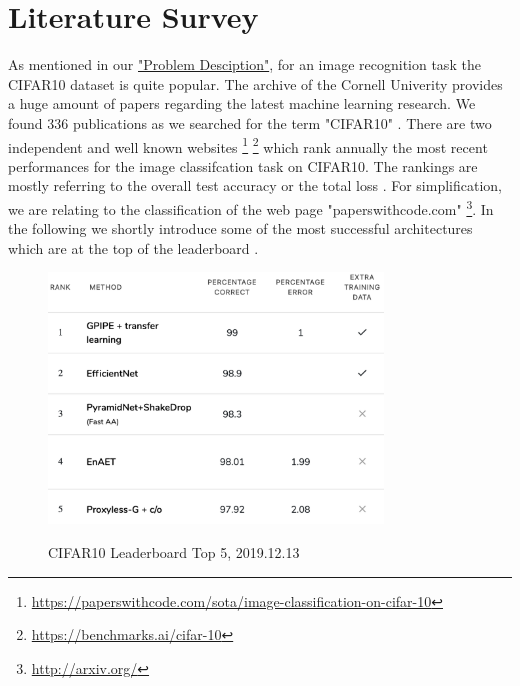 \documentclass[journal]{IEEEtran}
\begin{document}
\section{Literature Survey}
\noindent As mentioned in our \hyperref[sec:problemDescription]{"Problem Desciption"}, for an image recognition task the CIFAR10 dataset is quite popular. The archive of the Cornell Univerity provides a huge amount of papers regarding the latest machine learning research. We found 336 publications as we searched for the term "CIFAR10" . There are two independent and well known websites \footnote{\href{https://paperswithcode.com/sota/image-classification-on-cifar-10}{https://paperswithcode.com/sota/image-classification-on-cifar-10}} \footnote{\href{https://benchmarks.ai/cifar-10}{https://benchmarks.ai/cifar-10}} which rank annually the most recent performances for the image classifcation task on CIFAR10. The rankings are mostly referring to the overall test accuracy or the total loss \cite{echersly}. For simplification, we are relating to the classification of the web page "paperswithcode.com" \footnote{\href{http://arxiv.org/}{http://arxiv.org/}}. In the following we shortly introduce some of the most successful architectures which are at the top of the leaderboard \cite{RN13} \cite{RN14}. \\

\begin{figure}
  \begin{center}
  \includegraphics[width=3.5in]{photo/related_work.png}\\
  \caption{CIFAR10 Leaderboard Top 5, 2019.12.13}\label{leaderboard}
  \end{center}
\end{figure}
\end{document}
